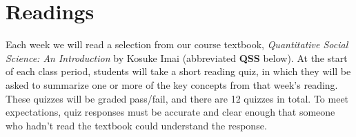 \documentclass[11pt, letterpaper]{article}
\begin{document}
%
%
%
%

\section*{Readings}

Each week we will read a selection from our course textbook, \textit{Quantitative Social Science: An Introduction} by Kosuke Imai (abbreviated \textbf{QSS} below). At the start of each class period, students will take a short reading quiz, in which they will be asked to summarize one or more of the key concepts from that week's reading. These quizzes will be graded pass/fail, and there are 12 quizzes in total. To meet expectations, quiz responses must be accurate and clear enough that someone who hadn't read the textbook could understand the response.
\end{document}
